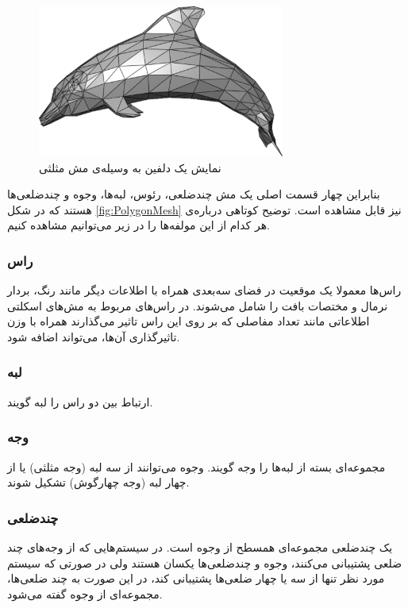 \begin{figure}[ht]
	\centerline{\includegraphics[width=\textwidth,height=5cm,keepaspectratio]{Figures/Ch2/Dolphin.png}}

	\caption{نمایش یک دلفین به وسیله‌ی مش مثلثی\cite{PolygonMeshWikipedia}}
	\label{fig:DolphinMesh}
\end{figure}


بنابراین چهار قسمت اصلی یک مش چندضلعی، رئوس، لبه‌ها، وجوه و چندضلعی‌ها هستند که در شکل 
\ref{fig:PolygonMesh}
نیز قابل‌ مشاهده است.
توضیح کوتاهی درباره‌ی هر کدام از این مولفه‌ها را در زیر می‌توانیم مشاهده کنیم.

\subsubsection{راس}
\label{Vertex}
راس‌ها معمولا یک موقعیت در فضای سه‌بعدی همراه با اطلاعات دیگر مانند رنگ، بردار نرمال و مختصات بافت را شامل می‌شوند. 
در راس‌های مربوط به مش‌های اسکلتی اطلاعاتی مانند تعداد مفاصلی که بر روی این راس تاثیر می‌گذارند همراه با وزن تاثیرگذاری آن‌ها، می‌تواند اضافه شود.

\subsubsection{لبه}
ارتباط بین دو راس را لبه گویند.

\subsubsection{وجه}
مجموعه‌ای بسته از لبه‌ها را وجه گویند. وجوه می‌توانند از سه لبه 
(وجه مثلثی)
یا از چهار لبه
(وجه چهارگوش)
تشکیل شوند.

\subsubsection{چندضلعی}
یک چندضلعی مجموعه‌ای همسطح از وجوه است.
در سیستم‌هایی که از وجه‌های چند ضلعی پشتیبانی می‌کنند، وجوه و چندضلعی‌ها یکسان هستند ولی در صورتی که سیستم مورد نظر تنها از سه یا چهار ضلعی‌ها پشتیبانی کند، در این صورت به چند ضلعی‌ها، مجموعه‌ای از وجوه گفته می‌شود.


